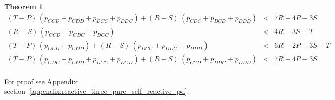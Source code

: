 \documentclass[11pt]{article}
\theoremstyle{plainCl1}
\newtheorem{theorem}{Theorem}
\theoremstyle{plainCl2}
\begin{document}
\begin{theorem}
\begin{equation*}
\begin{array}{ccc}
    (T - P)\,(p_{CCD} + p_{CDD} + p_{DCC} + p_{DDC}) + (R - S)\,(p_{CDC} + p_{DCD} + p_{DDD}) & < & 7 R - 4 P - 3 S \\ [0.2cm]
    (R - S)\,(p_{CCD} + p_{CDC} + p_{DCC}) & < & 4 R - 3 S - T \\ [0.2cm]
    (T - P)\,(p_{CCD} + p_{CDD}) + (R - S)\,(p_{DCC} + p_{DDC} + p_{DDD}) & < & 6 R - 2 P - 3 S - T \\ [0.2cm]
    (T - P)\,(p_{CDC} + p_{CDD} + p_{DCC} + p_{DCD}) + (R - S)\,(p_{CCD} + p_{DDC} + p_{DDD}) & < & 7 R - 4 P - 3 S \\ [0.2cm]
    \end{array}
\end{equation*}
\end{theorem}

For proof see Appendix section~\ref{appendix:reactive_three_pure_self_reactive_pd}.


\clearpage
\newpage

\appendix

\end{document}
